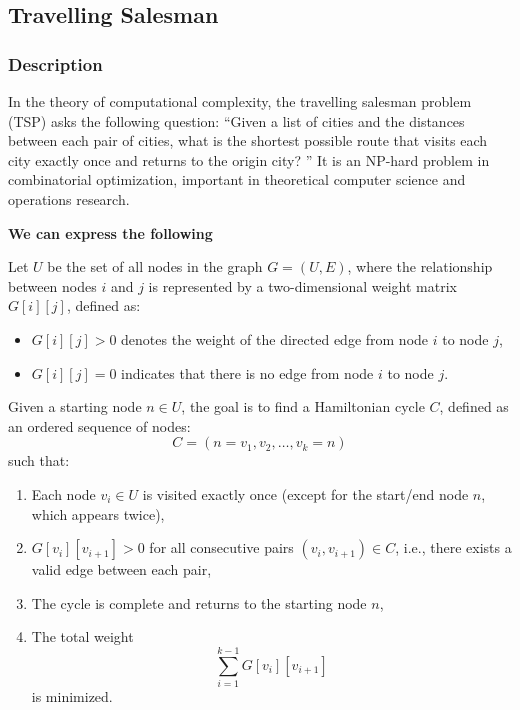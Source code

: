\subsection{Travelling Salesman}
\subsubsection{Description}

In the theory of computational complexity, the travelling salesman problem (TSP) asks the following question: ``Given a list of cities and the distances between each pair of cities, what is the shortest possible route that visits each city exactly once and returns to the origin city? '' It is an NP-hard problem in combinatorial optimization, important in theoretical computer science and operations research.

\textbf{We can express the following}

Let \( U \) be the set of all nodes in the graph \( G = (U, E) \), where the relationship between nodes \( i \) and \( j \) is represented by a two-dimensional weight matrix \( G[i][j] \), defined as:

\begin{itemize}
    \item \( G[i][j] > 0 \) denotes the weight of the directed edge from node \( i \) to node \( j \),
    \item \( G[i][j] = 0 \) indicates that there is no edge from node \( i \) to node \( j \).
\end{itemize}

Given a starting node \( n \in U \), the goal is to find a Hamiltonian cycle \( C \), defined as an ordered sequence of nodes:
\[
C = (n = v_1, v_2, \ldots, v_k = n)
\]
such that:

\begin{enumerate}[label= (\alph*)]
    \item Each node \( v_i \in U \) is visited exactly once (except for the start/end node \(  n \), which appears twice),
    \item \( G[v_i][v_{i+1}] > 0 \) for all consecutive pairs \( (v_i, v_{i+1}) \in C \), i.e., there exists a valid edge between each pair,
    \item The cycle is complete and returns to the starting node \( n \),
    \item The total weight
    \[
    \sum_{i=1}^{k-1} G[v_i][v_{i+1}]
    \]
    is minimized.
\end{enumerate}

